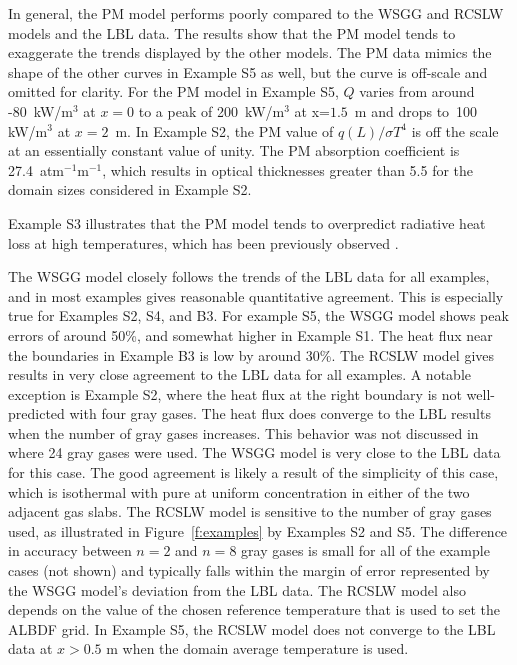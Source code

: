 \documentclass[preprint,12pt]{elsarticle}
\begin{document}
In general, the PM model performs poorly compared to the WSGG and RCSLW models and the LBL data. The results show that the PM model tends to exaggerate the trends displayed by the other models. The PM data mimics the shape of the other curves in Example S5 as well, but the curve is off-scale and omitted for clarity. For the PM model in Example S5, $Q$ varies from around -80~kW/m$^3$ at $x=0$ to a peak of 200~kW/m$^3$ at x=$1.5$~m and drops to~100 kW/m$^3$ at $x=2$~m.  In Example S2, the PM value of $q(L)/\sigma T^4$ is off the scale at an essentially constant value of unity.
%
The PM absorption coefficient is 27.4~atm$^{-1}$m$^{-1}$, which results in optical thicknesses greater than 5.5
for the domain sizes considered in Example S2.
%

Example S3 illustrates that the PM model tends to overpredict radiative heat loss at high temperatures, which has been previously observed \cite{Frank_2000,Zhu_2002,Coelho_2002}.

The WSGG model closely follows the trends of the LBL data for all examples, and in most examples gives reasonable quantitative agreement. This is especially true for Examples S2, S4, and B3. For example S5, the WSGG model shows peak errors of around 50\%, and somewhat higher in Example S1. The heat flux near the boundaries in Example B3 is low by around 30\%. The RCSLW model gives results in very close agreement to the LBL data for all examples. A notable exception is Example S2, where the heat flux at the right boundary is not well-predicted with four gray gases. The heat flux does converge to the LBL results when the number of gray gases increases. This behavior was not discussed in \cite{Solovjov_2017} where 24 gray gases were used. The WSGG model is very close to the LBL data for this case. The good agreement is likely a result of the simplicity of this case, which is isothermal with pure  at uniform concentration in either of the two adjacent gas slabs.  The RCSLW model is sensitive to the number of gray gases used, as illustrated in Figure~\ref{f:examples} by Examples S2 and S5. The difference in accuracy between $n=2$ and $n=8$ gray gases is small for all of the example cases (not shown) and typically falls within the margin of error represented by the WSGG model's deviation from the LBL data.
The RCSLW model also depends on the value of the chosen reference temperature that is used to set the ALBDF grid.  In Example S5, the RCSLW model does not converge to the LBL data at $x>0.5$ m when the domain average temperature is used.
\end{document}
